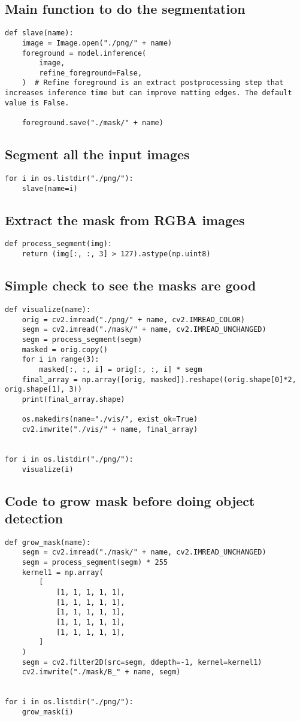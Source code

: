 \documentclass[11pt]{article}
\begin{document}
\subsection{Main function to do the segmentation}
\label{sec:org78b3997}
\begin{verbatim}
def slave(name):
    image = Image.open("./png/" + name)
    foreground = model.inference(
        image,
        refine_foreground=False,
    )  # Refine foreground is an extract postprocessing step that increases inference time but can improve matting edges. The default value is False.

    foreground.save("./mask/" + name)
\end{verbatim}
\subsection{Segment all the input images}
\label{sec:orgdb003fb}
\begin{verbatim}
for i in os.listdir("./png/"):
    slave(name=i)
\end{verbatim}
\subsection{Extract the mask from RGBA images}
\label{sec:orga413a37}
\begin{verbatim}
def process_segment(img):
    return (img[:, :, 3] > 127).astype(np.uint8)
\end{verbatim}
\subsection{Simple check to see the masks are good}
\label{sec:orga4e9117}
\begin{verbatim}
def visualize(name):
    orig = cv2.imread("./png/" + name, cv2.IMREAD_COLOR)
    segm = cv2.imread("./mask/" + name, cv2.IMREAD_UNCHANGED)
    segm = process_segment(segm)
    masked = orig.copy()
    for i in range(3):
        masked[:, :, i] = orig[:, :, i] * segm
    final_array = np.array([orig, masked]).reshape((orig.shape[0]*2, orig.shape[1], 3))
    print(final_array.shape)

    os.makedirs(name="./vis/", exist_ok=True)
    cv2.imwrite("./vis/" + name, final_array)


for i in os.listdir("./png/"):
    visualize(i)
\end{verbatim}
\subsection{Code to grow mask before doing object detection}
\label{sec:orgf6d4a60}
\begin{verbatim}
def grow_mask(name):
    segm = cv2.imread("./mask/" + name, cv2.IMREAD_UNCHANGED)
    segm = process_segment(segm) * 255
    kernel1 = np.array(
        [
            [1, 1, 1, 1, 1],
            [1, 1, 1, 1, 1],
            [1, 1, 1, 1, 1],
            [1, 1, 1, 1, 1],
            [1, 1, 1, 1, 1],
        ]
    )
    segm = cv2.filter2D(src=segm, ddepth=-1, kernel=kernel1)
    cv2.imwrite("./mask/B_" + name, segm)


for i in os.listdir("./png/"):
    grow_mask(i)
\end{verbatim}
\end{document}

